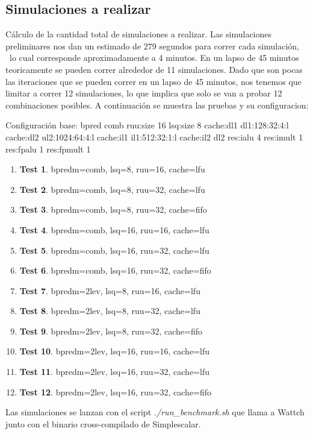 \documentclass[journal]{IEEEtran}
\begin{document}
\subsection{Simulaciones a realizar}
C\'{a}lculo de la cantidad total de simulaciones a realizar.
Las simulaciones preliminares nos dan un estimado de 279 segundos para correr cada simulaci\'{o}n, \
lo cual corresponde aproximadamente a 4 minutos.  En un lapso de 45 minutos teoricamente se pueden correr alrededor de 11 simulaciones. Dado que son pocas las iteraciones que se pueden correr en un lapso de 45 minutos,
nos tenemos que limitar a correr 12 simulaciones, lo que implica que solo se van a probar 12 combinaciones posibles.
A continuaci\'{o}n se muestra las pruebas y su configuracion: \newline

Configuraci\'on base:
bpred           comb
ruu:size        16
lsq:size        8
cache:dl1       dl1:128:32:4:l
cache:dl2       ul2:1024:64:4:l
cache:il1       il1:512:32:1:l
cache:il2       dl2
res:ialu        4
res:imult       1
res:fpalu       1
res:fpmult      1

\begin{enumerate}
\item \textbf{Test 1}.  bpredm=comb, lsq=8, ruu=16, cache=lfu
\item \textbf{Test 2}.  bpredm=comb, lsq=8, ruu=32, cache=lfu
\item \textbf{Test 3}.  bpredm=comb, lsq=8, ruu=32, cache=fifo
\item \textbf{Test 4}.  bpredm=comb, lsq=16, ruu=16, cache=lfu
\item \textbf{Test 5}.  bpredm=comb, lsq=16, ruu=32, cache=lfu
\item \textbf{Test 6}.  bpredm=comb, lsq=16, ruu=32, cache=fifo
\item \textbf{Test 7}.  bpredm=2lev, lsq=8, ruu=16, cache=lfu
\item \textbf{Test 8}.  bpredm=2lev, lsq=8, ruu=32, cache=lfu
\item \textbf{Test 9}.  bpredm=2lev, lsq=8, ruu=32, cache=fifo
\item \textbf{Test 10}. bpredm=2lev, lsq=16, ruu=16, cache=lfu
\item \textbf{Test 11}. bpredm=2lev, lsq=16, ruu=32, cache=lfu
\item \textbf{Test 12}. bpredm=2lev, lsq=16, ruu=32, cache=fifo \newline
\end{enumerate}

Las simulaciones se lanzan con el script \textit{./run\_benchmark.sh} que llama a Wattch junto con el binario cross-compilado de Simplescalar.
\end{document}
